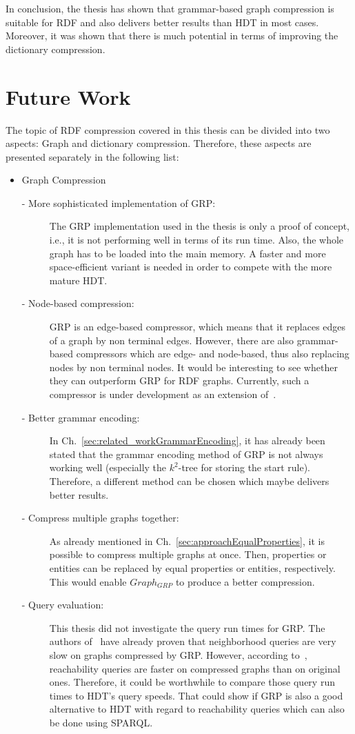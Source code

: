 In conclusion, the thesis has shown that grammar-based graph compression is suitable for RDF and also delivers better results than HDT in most cases. Moreover, it was shown that there is much potential in terms of improving the dictionary compression.

\section{Future Work}\label{sec:futurework}

The topic of RDF compression covered in this thesis can be divided into two aspects: Graph and dictionary compression. Therefore, these aspects are presented separately in the following list:

\begin{itemize}
	\item Graph Compression
	\begin{description}
		\item [- More sophisticated implementation of GRP:] The GRP implementation used in the thesis is only a proof of concept, i.e., it is not performing well in terms of its run time. Also, the whole graph has to be loaded into the main memory. A faster and more space-efficient variant is needed in order to compete with the more mature HDT.
		\item [- Node-based compression:] GRP is an edge-based compressor, which means that it replaces edges of a graph by non terminal edges. However, there are also grammar-based compressors which are edge- and node-based, thus also replacing nodes by non terminal nodes. It would be interesting to see whether they can outperform GRP for RDF graphs. Currently, such a compressor is under development as an extension of~\cite{mattdk}.
		\item [- Better grammar encoding:] In Ch.~\ref{sec:related_workGrammarEncoding}, it has already been stated that the grammar encoding method of GRP is not always working well (especially the $k^2$-tree for storing the start rule). Therefore, a different method can be chosen which maybe delivers better results.
		\item [- Compress multiple graphs together:] As already mentioned in Ch.~\ref{sec:approachEqualProperties}, it is possible to compress multiple graphs at once. Then, properties or entities can be replaced by equal properties or entities, respectively. This would enable $Graph_{GRP}$ to produce a better compression.
		\item [- Query evaluation:] This thesis did not investigate the query run times for GRP. The authors of~\cite{maneth} have already proven that neighborhood queries are very slow on graphs compressed by GRP. However, according to~\cite{maneth}, reachability queries are faster on compressed graphs than on original ones. Therefore, it could be worthwhile to compare those query run times to HDT's query speeds. That could show if GRP is also a good alternative to HDT with regard to reachability queries which can also be done using SPARQL.

\end{description}
\end{itemize}
